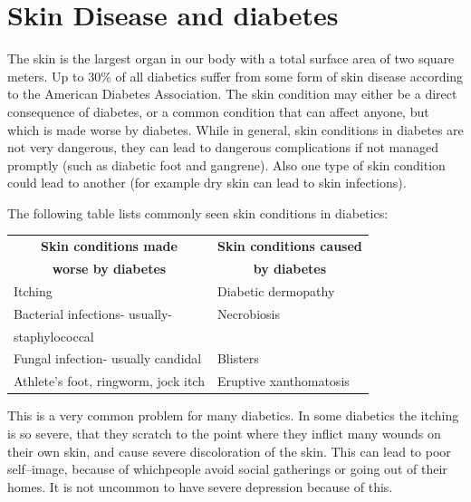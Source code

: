 \newpage
 
\renewcommand{\thechapter}{\arabic{chapter}A}
\chapter{Skin Disease and diabetes}\label{chap18A}

The skin is the largest organ in our body with a total surface area of two square meters. Up to 30\% of all diabetics suffer from some form of skin disease according to the American Diabetes Association. The skin condition may either be a direct consequence of diabetes, or a common condition that can affect anyone, but which is made worse by diabetes. While in general, skin conditions in diabetes are not very dangerous, they can lead to dangerous complications if not managed promptly (such as diabetic foot and gangrene). Also one type of skin condition could lead to another (for example dry skin can lead to skin infections).

\vskip 4pt
\noindent The following table lists commonly seen skin conditions in diabetics:

\begin{center}
\begin{tabular}{|l|l|}
\hline
\multicolumn{1}{|c}{\textbf{Skin conditions made}} & \multicolumn{1}{|c|}{\textbf{Skin conditions caused}}\\
\multicolumn{1}{|c}{\textbf{worse by diabetes}} & \multicolumn{1}{|c|}{\textbf{by diabetes}}\\
\hline
Itching & Diabetic dermopathy\\
\hline
Bacterial infections- usually- & Necrobiosis\\
staphylococcal & \\
\hline
Fungal infection- usually candidal & Blisters\\
\hline
Athlete’s foot, ringworm, jock itch & Eruptive xanthomatosis\\
\hline
\end{tabular}
\end{center}


This is a very common problem for many diabetics. In some dia\-betics the itching is so severe, that they scratch to the point where they inflict many wounds on their own skin, and cause severe dis\-coloration of the skin. This can lead to poor self–image, because of which\break people avoid social gatherings or going out of their homes. It is not un\-common to have severe depression because of this.

